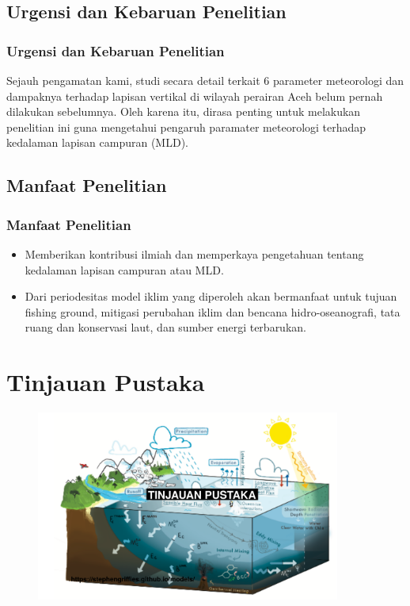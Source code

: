 \documentclass{beamer}
\begin{document}
\subsection{Urgensi dan Kebaruan Penelitian}
\begin{frame}
	\frametitle{Urgensi dan Kebaruan Penelitian}
	Sejauh pengamatan kami, studi secara detail terkait 6 parameter meteorologi dan dampaknya terhadap lapisan vertikal di wilayah perairan Aceh belum pernah dilakukan sebelumnya. Oleh karena itu, dirasa penting untuk melakukan penelitian ini guna mengetahui pengaruh paramater meteorologi terhadap kedalaman lapisan campuran (MLD).
\end{frame}

\subsection{Manfaat Penelitian}
\begin{frame}
	\frametitle{Manfaat Penelitian}
	\begin{itemize}
		\item Memberikan kontribusi ilmiah dan memperkaya pengetahuan tentang kedalaman lapisan campuran atau MLD.
		\item Dari periodesitas model iklim yang diperoleh akan bermanfaat untuk tujuan fishing ground, mitigasi perubahan iklim dan bencana hidro-oseanografi, tata ruang dan konservasi laut, dan sumber energi terbarukan.
	\end{itemize}
\end{frame}

\section{Tinjauan Pustaka}
\begin{frame}
	\centering
	\begin{figure}[H]
		\centering
		\includegraphics[width=10cm]{Bg_2}
	\end{figure}
\end{frame}
\end{document}
